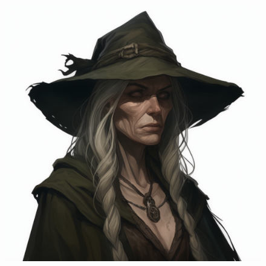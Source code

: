 
\begin{figure}[h]
\begin{center}
\includegraphics[scale=0.24]{img/ai-images/hag.png}
\end{center}
\end{figure}
